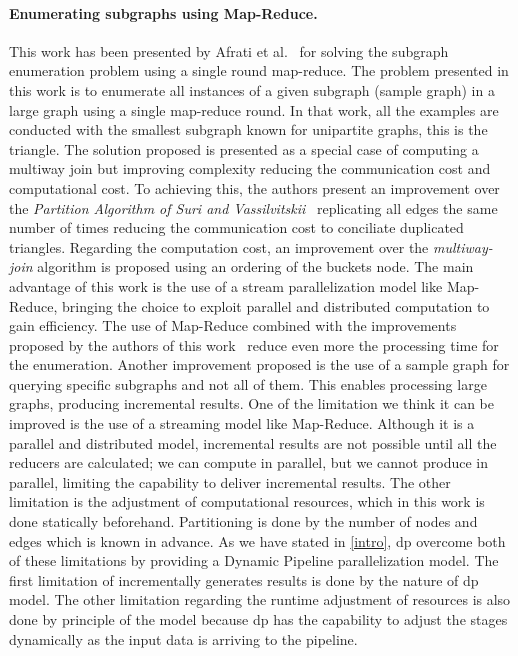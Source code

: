 \paragraph{Enumerating subgraphs using Map-Reduce.} This work has been presented by Afrati et al.~\cite{enumeratingsg} for solving the subgraph enumeration problem using a single round map-reduce.
The problem presented in this work is to enumerate all instances of a given subgraph (sample graph) in a large graph using a single map-reduce round. 
In that work, all the examples are conducted with the smallest subgraph known for unipartite graphs, this is the triangle.
The solution proposed is presented as a special case of computing a multiway join but improving complexity reducing the communication cost and computational cost.
To achieving this, the authors present an improvement over the \emph{Partition Algorithm of Suri and Vassilvitskii}~\cite{partitionalgo} replicating all edges the same number of times reducing the communication cost to conciliate duplicated triangles. 
Regarding the computation cost, an improvement over the \emph{multiway-join} algorithm is proposed using an ordering of the buckets node. 
The main advantage of this work is the use of a stream parallelization model like Map-Reduce, bringing the choice to exploit parallel and distributed computation to gain efficiency. 
The use of Map-Reduce combined with the improvements proposed by the authors of this work~\cite{enumeratingsg} reduce even more the processing time for the enumeration. 
Another improvement proposed is the use of a sample graph for querying specific subgraphs and not all of them. This enables processing large graphs, producing incremental results.
One of the limitation we think it can be improved is the use of a streaming model like Map-Reduce. Although it is a parallel and distributed model, incremental results are not possible until all the reducers are calculated; we can compute in parallel, but we cannot produce in parallel, limiting the capability to deliver incremental results. 
The other limitation is the adjustment of computational resources, which in this work is done statically beforehand. Partitioning is done by the number of nodes and edges which is known in advance.
As we have stated in \autoref{intro}, \acrshort{dp} overcome both of these limitations by providing a Dynamic Pipeline parallelization model. The first limitation of incrementally generates results is done by the nature of \acrshort{dp} model. 
The other limitation regarding the runtime adjustment of resources is also done by principle of the model because \acrshort{dp} has the capability to adjust the stages dynamically as the input data is arriving to the pipeline. 

